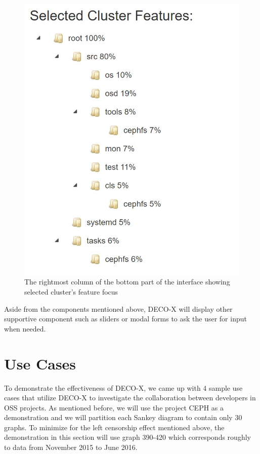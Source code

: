 \documentclass{article}
\begin{document}
\begin{figure}[h!]
\centering
\includegraphics[scale=0.6]{images/rightmost.JPG}
\caption{The rightmost column of the bottom part of the interface showing selected cluster's feature focus}
\label{fig:rightmost}
\end{figure}

Aside from the components mentioned above, DECO-X will display other supportive component such as sliders or modal forms to ask the user for input when needed.
\section{Use Cases}
To demonstrate the effectiveness of DECO-X, we came up with 4 sample use cases that utilize DECO-X to investigate the collaboration between developers in OSS projects. As mentioned before, we will use the project CEPH as a demonstration and we will partition each Sankey diagram to contain only 30 graphs. To minimize for the left censorship effect mentioned above, the demonstration in this section will use graph 390-420 which corresponds roughly to data from November 2015 to June 2016.
\end{document}
